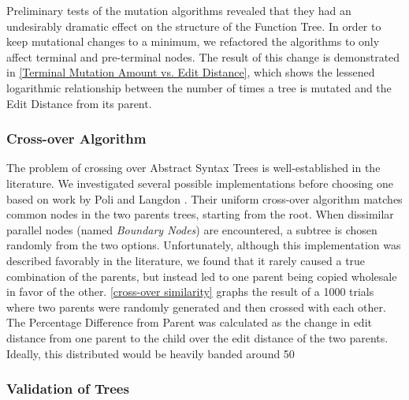 \documentclass{acm_proc_article-sp}
\begin{document}
Preliminary tests of the mutation algorithms revealed that they had an undesirably dramatic effect on the structure of the Function Tree. In order to keep mutational changes to a minimum, we refactored the algorithms to only affect terminal and pre-terminal nodes. The result of this change is demonstrated in \ref{Terminal Mutation Amount vs. Edit Distance}, which shows the lessened logarithmic relationship between the number of times a tree is mutated and the Edit Distance from its parent.

\subsubsection{Cross-over Algorithm}

The problem of crossing over Abstract Syntax Trees is well-established in the literature. We investigated several possible implementations before choosing one based on work by Poli and Langdon \cite{crossover}. Their uniform cross-over algorithm matches common nodes in the two parents trees, starting from the root. When dissimilar parallel nodes (named \textit{Boundary Nodes}) are encountered, a subtree is chosen randomly from the two options. 
Unfortunately, although this implementation was described favorably in the literature, we found that it rarely caused a true combination of the parents, but instead led to one parent being copied wholesale in favor of the other. \ref{cross-over similarity} graphs the result of a 1000 trials where two parents were randomly generated and then crossed with each other. The Percentage Difference from Parent was calculated as the change in edit distance from one parent to the child over the edit distance of the two parents. Ideally, this distributed would be heavily banded around 50%

\subsubsection{Validation of Trees}
\end{document}
